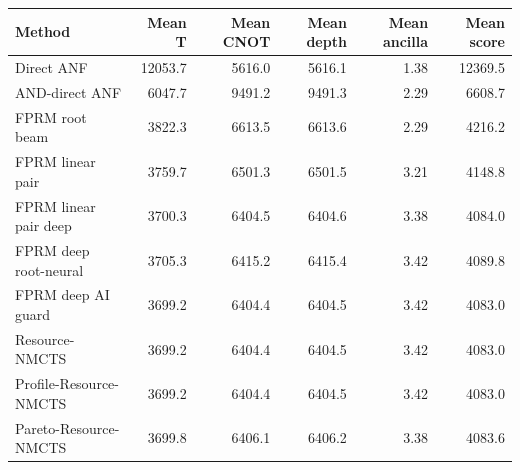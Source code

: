 \begin{tabular}{lrrrrr}
\toprule
Method & Mean T & Mean CNOT & Mean depth & Mean ancilla & Mean score \\
\midrule
Direct ANF & 12053.7 & 5616.0 & 5616.1 & 1.38 & 12369.5 \\
AND-direct ANF & 6047.7 & 9491.2 & 9491.3 & 2.29 & 6608.7 \\
FPRM root beam & 3822.3 & 6613.5 & 6613.6 & 2.29 & 4216.2 \\
FPRM linear pair & 3759.7 & 6501.3 & 6501.5 & 3.21 & 4148.8 \\
FPRM linear pair deep & 3700.3 & 6404.5 & 6404.6 & 3.38 & 4084.0 \\
FPRM deep root-neural & 3705.3 & 6415.2 & 6415.4 & 3.42 & 4089.8 \\
FPRM deep AI guard & 3699.2 & 6404.4 & 6404.5 & 3.42 & 4083.0 \\
Resource-NMCTS & 3699.2 & 6404.4 & 6404.5 & 3.42 & 4083.0 \\
Profile-Resource-NMCTS & 3699.2 & 6404.4 & 6404.5 & 3.42 & 4083.0 \\
Pareto-Resource-NMCTS & 3699.8 & 6406.1 & 6406.2 & 3.38 & 4083.6 \\
\bottomrule
\end{tabular}
